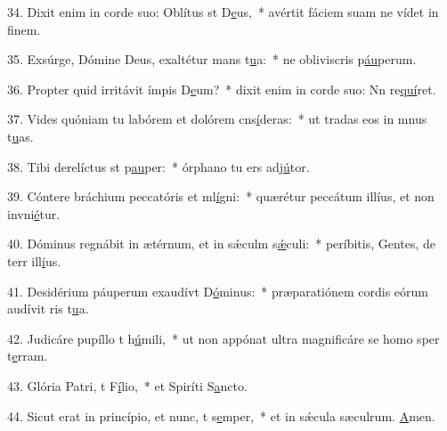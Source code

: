 34. Dixit enim in corde suo: Oblítus st D\uline{e}us,~* avértit fáciem suam ne vídet in f\uline{i}nem.\par 
35. Exsúrge, Dómine Deus, exaltétur mans t\uline{u}a:~* ne obliviscris p\uline{áu}perum.\par 
36. Propter quid irritávit ímpis D\uline{e}um?~* dixit enim in corde suo: Nn re\uline{quí}ret.\par 
37. Vides quóniam tu labórem et dolórem cns\uline{í}deras:~* ut tradas eos in mnus t\uline{u}as.\par 
38. Tibi derelíctus st p\uline{au}per:~* órphano tu ers adj\uline{ú}tor.\par 
39. Cóntere bráchium peccatóris et ml\uline{í}gni:~* quærétur peccátum illíus, et non invni\uline{é}tur.\par 
40. Dóminus regnábit in ætérnum, et in sǽculm s\uline{ǽ}culi:~* períbitis, Gentes, de terr ill\uline{í}us.\par 
41. Desidérium páuperum exaudívt D\uline{ó}minus:~* præparatiónem cordis eórum audívit ris t\uline{u}a.\par 
42. Judicáre pupíllo t h\uline{ú}mili,~* ut non appónat ultra magnificáre se homo sper t\uline{e}rram.\par 
43. Glória Patri, t F\uline{í}lio,~* et Spiríti S\uline{a}ncto.\par 
44. Sicut erat in princípio, et nunc, t s\uline{e}mper,~* et in sǽcula sæculrum. \uline{A}men.\par 
